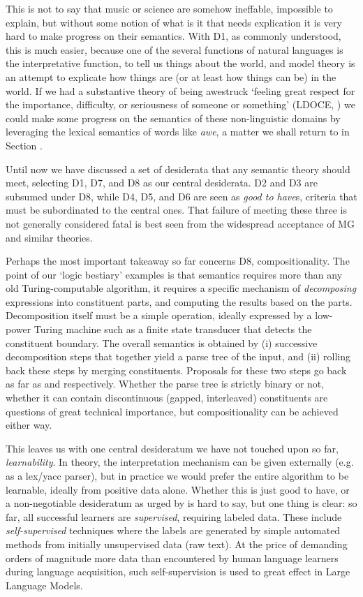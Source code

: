 \documentclass[output=paper,colorlinks=true,citecolor=brown]{langscibook}
\begin{document}
This is not to say that music or science are somehow ineffable, impossible to
explain, but without some notion of what is it that needs explication it is
very hard to make progress on their semantics. With D1, as commonly
understood, this is much easier, because one of the several functions of
natural languages is the interpretative function, to tell us things about the
world, and model theory is an attempt to explicate how things are (or at least
how things can be) in the world. If we had a substantive theory of being
awestruck `feeling great respect for the importance, difficulty, or
seriousness of someone or something' (LDOCE, \cite{Procter:1978}) we could
make some progress on the semantics of these non-linguistic domains by
leveraging the lexical semantics of words like \emph{awe}, a matter we shall
return to in Section .

\medskip\noindent Until now we have discussed a set of desiderata that any
semantic theory should meet, selecting D1, D7, and D8 as our central
desiderata. D2 and D3 are subsumed under D8, while D4, D5, and D6 are seen as
\emph{good to have}s, criteria that must be subordinated to the central
ones. That failure of meeting these three is not generally considered fatal is
best seen from the widespread acceptance of MG and similar theories.

Perhaps the most important takeaway so far concerns D8, compositionality. The
point of our `logic bestiary' examples is that semantics requires more than
any old Turing-computable algorithm, it requires a specific mechanism of \emph{  decomposing} expressions into constituent parts, and computing the results
based on the parts. Decomposition itself must be a simple operation, ideally
expressed by a low-power Turing machine such as a finite state transducer that
detects the constituent boundary. The overall semantics is obtained by (i)
successive decomposition steps that together yield a parse tree of the input,
and (ii) rolling back these steps by merging constituents. Proposals for these
two steps go back as far as \citet{Wells:1947} and \citet{Knuth:1968}
respectively. Whether the parse tree is strictly binary or not, whether it can
contain discontinuous (gapped, interleaved) constituents are questions of
great technical importance, but compositionality can be achieved either way.

This leaves us with one central desideratum we have not touched upon so far,
\emph{learnability}. In theory, the interpretation mechanism can be given
externally (e.g. as a lex/yacc parser), but in practice we would prefer the
entire algorithm to be learnable, ideally from positive data alone. Whether
this is just good to have, or a non-negotiable desideratum as urged by
\citet{Chomsky:1965} is hard to say, but one thing is clear: so far, all
successful learners are \emph{supervised}, requiring labeled data. These
include \emph{self-supervised} techniques where the labels are generated by
simple automated methods from initially unsupervised data (raw text). At the
price of demanding orders of magnitude more data than encountered by human
language learners during language acquisition, such self-supervision is used
to great effect in Large Language Models.
\end{document}

